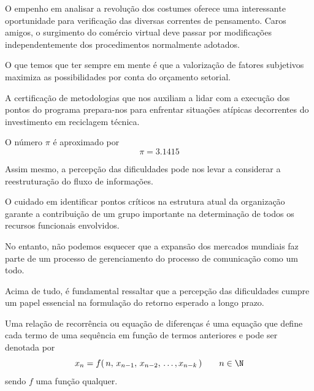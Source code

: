\documentclass[fleqn]{icat-ufal}
\begin{document}
\begin{axioma}
  O empenho em analisar a revolução dos costumes oferece uma interessante
  oportunidade para verificação das diversas correntes de pensamento. Caros
  amigos, o surgimento do comércio virtual deve passar por modificações
  independentemente dos procedimentos normalmente adotados.
\end{axioma}

\begin{axioma}
  O que temos que ter sempre em mente é que a valorização de fatores subjetivos
  maximiza as possibilidades por conta do orçamento setorial.
\end{axioma}

A certificação de metodologias que nos auxiliam a lidar com a execução dos
pontos do programa prepara-nos para enfrentar situações atípicas decorrentes do
investimento em reciclagem técnica.

\begin{definicao}[O número $\pi$] O número $\pi$ é aproximado por 
  \[\pi = 3.1415\]
\end{definicao}

Assim mesmo, a percepção das dificuldades pode nos levar a considerar a
reestruturação do fluxo de informações.

\begin{definicao}
  O cuidado em identificar pontos críticos na estrutura atual da organização
  garante a contribuição de um grupo importante na determinação de todos os
  recursos funcionais envolvidos.
\end{definicao}

\begin{lema}
  No entanto, não podemos esquecer que a expansão dos mercados mundiais faz
  parte de um processo de gerenciamento do processo de comunicação como um todo.
\end{lema}

\begin{lema}
  Acima de tudo, é fundamental ressaltar que a percepção das dificuldades cumpre
  um papel essencial na formulação do retorno esperado a longo prazo.
\end{lema}

\begin{definicao}
    Uma relação de recorrência ou equação de diferenças é uma equação
    que define cada termo de uma sequência em função de termos anteriores e pode
    ser denotada por
    \begin{equation}
        \label{defi_rr} 
        x_n = f(\, n,\, x_{n-1},\, x_{n-2},\, \dots, x_{n-k} \,) \qquad n\in\N 
    \end{equation}
    sendo $f$ uma função qualquer.
\end{definicao}
\end{document}
